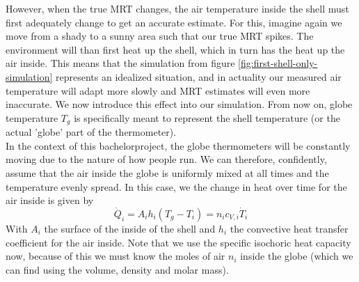 \documentclass[]{scrartcl}
\begin{document}
However, when the true MRT changes, the air temperature inside the shell must first adequately change to get an accurate estimate. For this, imagine again we move from a shady to a sunny area such that our true MRT spikes. The environment will than first heat up the shell, which in turn has the heat up the air inside. This means that the simulation from figure \ref{fig:first-shell-only-simulation} represents an idealized situation, and in actuality our measured air temperature will adapt more slowly and MRT estimates will even more inaccurate. We now introduce this effect into our simulation. From now on, globe temperature $T_g$ is specifically meant to represent the shell temperature (or the actual 'globe' part of the thermometer).
\\

In the context of this bachelorproject, the globe thermometers will be constantly moving due to the nature of how people run. We can  therefore, confidently, assume that the air inside the globe is uniformly mixed at all times and the temperature evenly spread. In this case, we the change in heat over time for the air inside is given by
$$
\dot{Q}_i = A_ih_i(T_g - T_i) = n_ic_{V,i} \dot{T}_i
$$
With $A_i$ the surface of the inside of the shell and $h_i$ the convective heat transfer coefficient for the air inside. Note that we use the specific isochoric heat capacity now, because of this we must know the moles of air $n_i$ inside the globe (which we can find using the volume, density and molar mass).
\\
\end{document}
